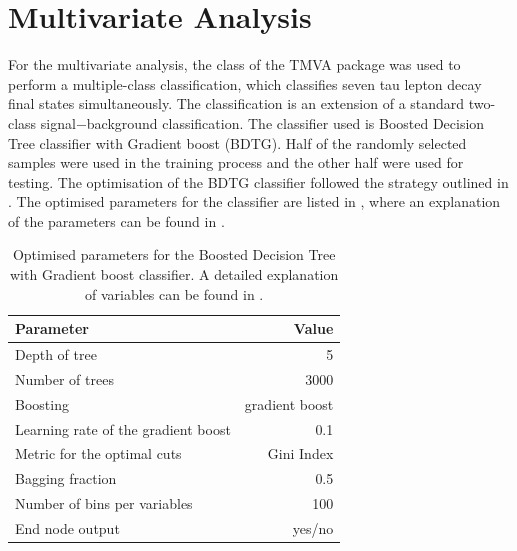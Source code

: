\section{Multivariate Analysis}
\label{sec:tauMVA}

For the multivariate analysis, the \multiclass class of the TMVA package \cite{Therhaag:2009dp} was used to perform a multiple-class classification, which classifies seven tau lepton decay final states simultaneously. The \multiclass classification is an extension of a standard two-class signal$-$background classification. The classifier used  is Boosted Decision Tree classifier with Gradient boost (BDTG). Half of the randomly selected samples were used in the training process and the other half were used for testing. The optimisation of the BDTG classifier followed the strategy outlined in . The optimised parameters for the classifier are listed in , where an explanation of the parameters can be found in .




\begin{table}[!htbp]\centering
\begin{tabular}{lr}
\hline \hline
 Parameter &  Value \\
\hline
Depth of tree & 5 \\
Number of trees & 3000 \\
Boosting & gradient boost \\
Learning rate of the gradient boost & 0.1 \\
Metric for the optimal cuts & Gini Index \\
Bagging fraction & 0.5 \\
Number of bins per variables & 100 \\
End node output & yes/no \\
\hline \hline
\end{tabular}

\caption
{Optimised parameters for the Boosted Decision Tree with Gradient boost \multiclass classifier. A detailed explanation of variables can be found in .}
\label{tab:tauBDTparameters}
\end{table}


